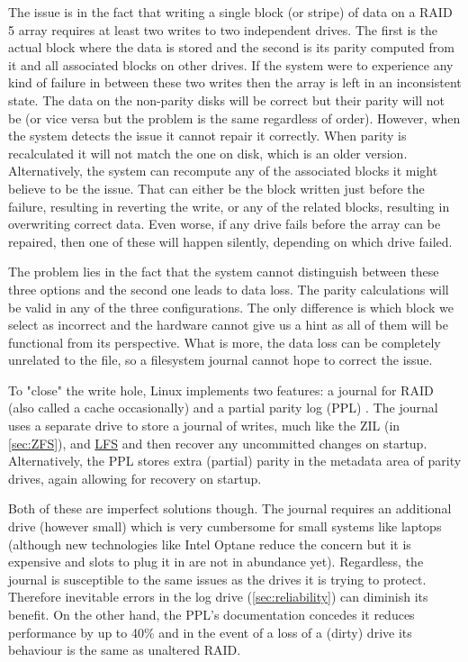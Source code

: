         The issue is in the fact that writing a single block (or stripe) of
        data on a RAID 5 array requires at least two writes to two independent
        drives. The first is the actual block where the data is stored and the
        second is its parity computed from it and all associated blocks on other
        drives. If the system were to experience any kind of failure in between
        these two writes then the array is left in an inconsistent state. The
        data on the non-parity disks will be correct but their parity will not be
        (or vice versa but the problem is the same regardless of order).
        However, when the system detects the issue it cannot repair it
        correctly. When parity is recalculated it will not match the one on
        disk, which is an older version. Alternatively, the system can
        recompute any of the associated blocks it might believe to be the
        issue. That can either be the block written just before the failure,
        resulting in reverting the write, or any of the related blocks,
        resulting in overwriting correct data. Even worse, if any drive fails
        before the array can be repaired, then one of these will happen
        silently, depending on which drive failed.

        The problem lies in the fact that the system cannot distinguish between
        these three options and the second one leads to data loss. The parity
        calculations will be valid in any of the three configurations. The only
        difference is which block we select as incorrect and the hardware
        cannot give us a hint as all of them will be functional from its
        perspective. What is more, the data loss can be completely unrelated to
        the file, so a filesystem journal cannot hope to correct the issue.

        To "close" the write hole, Linux implements two features: a journal for
        RAID \cite{LWN_md_journal} (also called a cache occasionally) and a
        partial parity log (PPL) \cite{partial_parity_log}. The journal uses a
        separate drive to store a journal of writes, much like the ZIL (in
        \autoref{sec:ZFS}),  and \hyperref[sec:LFS]{LFS} and then
        recover any uncommitted changes on startup. Alternatively, the PPL
        stores extra (partial) parity in the metadata area of parity drives,
        again allowing for recovery on startup.

        Both of these are imperfect solutions though. The journal requires an
        additional drive (however small) which is very cumbersome for small
        systems like laptops (although new technologies like Intel Optane
        \cite{Intel_Optane} reduce the concern but it is expensive and slots
        to plug it in are not in abundance yet). Regardless, the journal is
        susceptible to the same issues as the drives it is trying to protect.
        Therefore inevitable errors in the log drive (\autoref{sec:reliability})
        can diminish its benefit. On the other hand, the PPL's  documentation
        \cite{partial_parity_log} concedes it reduces performance by up to 40\%
        and in the event of a loss of a (dirty) drive its behaviour is the same
        as unaltered RAID.

